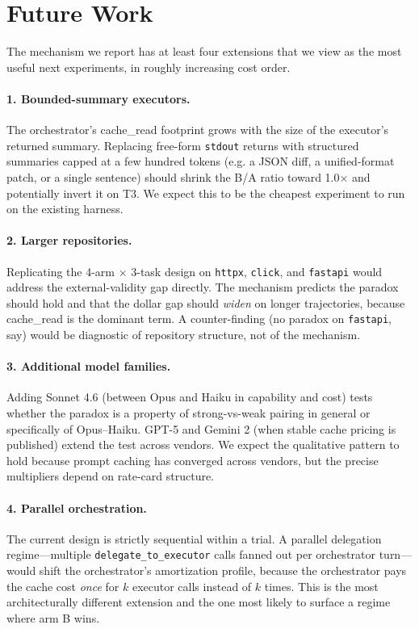 \documentclass[11pt,a4paper]{article}
\begin{document}
\section{Future Work}
\label{sec:future}

The mechanism we report has at least four extensions that we view as the most useful next experiments, in roughly increasing cost order.

\paragraph{1. Bounded-summary executors.}
The orchestrator's cache_read footprint grows with the size of the executor's returned summary. Replacing free-form \texttt{stdout} returns with structured summaries capped at a few hundred tokens (e.g. a JSON diff, a unified-format patch, or a single sentence) should shrink the B/A ratio toward 1.0$\times$ and potentially invert it on T3. We expect this to be the cheapest experiment to run on the existing harness.

\paragraph{2. Larger repositories.}
Replicating the 4-arm $\times$ 3-task design on \texttt{httpx}, \texttt{click}, and \texttt{fastapi} would address the external-validity gap directly. The mechanism predicts the paradox should hold and that the dollar gap should \emph{widen} on longer trajectories, because cache\_read is the dominant term. A counter-finding (no paradox on \texttt{fastapi}, say) would be diagnostic of repository structure, not of the mechanism.

\paragraph{3. Additional model families.}
Adding Sonnet 4.6 (between Opus and Haiku in capability and cost) tests whether the paradox is a property of strong-vs-weak pairing in general or specifically of Opus--Haiku. GPT-5 and Gemini 2 (when stable cache pricing is published) extend the test across vendors. We expect the qualitative pattern to hold because prompt caching has converged across vendors, but the precise multipliers depend on rate-card structure.

\paragraph{4. Parallel orchestration.}
The current design is strictly sequential within a trial. A parallel delegation regime---multiple \texttt{delegate\_to\_executor} calls fanned out per orchestrator turn---would shift the orchestrator's amortization profile, because the orchestrator pays the cache cost \emph{once} for $k$ executor calls instead of $k$ times. This is the most architecturally different extension and the one most likely to surface a regime where arm B wins.
\end{document}
